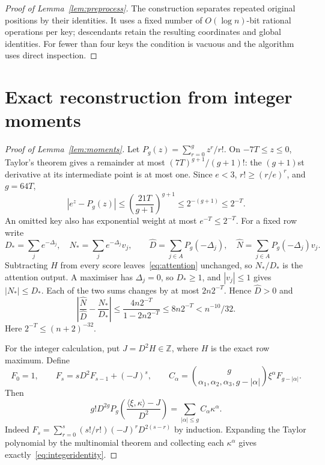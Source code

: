 \documentclass[notab,a4paper,UKenglish,numberwithinsect]{socg-lipics-v2021}
\newcommand{\Z}{\mathbb Z}
\newcommand{\ip}[2]{\langle #1,#2\rangle}
\begin{document}
\begin{proof}[Proof of Lemma~\ref{lem:preprocess}]
The construction separates repeated original positions by their identities. It uses a fixed number of $O(\log n)$-bit rational operations per key; descendants retain the resulting coordinates and global identities. For fewer than four keys the condition is vacuous and the algorithm uses direct inspection.
\end{proof}

\section{Exact reconstruction from integer moments}\label{app:numerics}
\begin{proof}[Proof of Lemma~\ref{lem:moments}]
Let $P_g(z)=\sum_{r=0}^g z^r/r!$. On $-7T\le z\le0$, Taylor's theorem gives a remainder at most $(7T)^{g+1}/(g+1)!$: the $(g+1)$st derivative at its intermediate point is at most one. Since $e<3$, $r!\ge(r/e)^r$, and $g=64T$,
\[
 |e^z-P_g(z)|
 \le\left(\frac{21T}{g+1}\right)^{g+1}
 \le2^{-(g+1)}\le2^{-T}.
\]
An omitted key also has exponential weight at most $e^{-T}\le2^{-T}$. For a fixed row write
\[
 D_*=\sum_j e^{-\Delta_j},\quad N_*=\sum_j e^{-\Delta_j}v_j,\qquad
 \widehat D=\sum_{j\in A}P_g(-\Delta_j),\quad
 \widehat N=\sum_{j\in A}P_g(-\Delta_j)v_j.
\]
Subtracting $H$ from every score leaves~\eqref{eq:attention} unchanged, so $N_*/D_*$ is the attention output. A maximiser has $\Delta_j=0$, so $D_*\ge1$, and $|v_j|\le1$ gives $|N_*|\le D_*$. Each of the two sums changes by at most $2n2^{-T}$. Hence $\widehat D>0$ and
\begin{equation}\label{eq:ratio}
 \left|\frac{\widehat N}{\widehat D}-\frac{N_*}{D_*}\right|
 \le\frac{4n2^{-T}}{1-2n2^{-T}}
 \le8n2^{-T}<n^{-10}/32.
\end{equation}
Here $2^{-T}\le(n+2)^{-32}$.

For the integer calculation, put $J=D^2H\in\Z$, where $H$ is the exact row maximum. Define
\begin{equation}\label{eq:integercoef}
 F_0=1,\qquad F_s=sD^2F_{s-1}+(-J)^s,\qquad
 C_\alpha=\binom{g}{\alpha_1,\alpha_2,\alpha_3,g-|\alpha|}
                  \xi^\alpha F_{g-|\alpha|}.
\end{equation}
Then
\begin{equation}\label{eq:integeridentity}
 g!D^{2g}P_g\!\left(\frac{\ip{\xi}{\kappa}-J}{D^2}\right)
       =\sum_{|\alpha|\le g}C_\alpha\kappa^\alpha.
\end{equation}
Indeed $F_s=\sum_{r=0}^s(s!/r!)(-J)^rD^{2(s-r)}$ by induction. Expanding the Taylor polynomial by the multinomial theorem and collecting each $\kappa^\alpha$ gives exactly~\eqref{eq:integeridentity}.


\end{proof}
\end{document}
